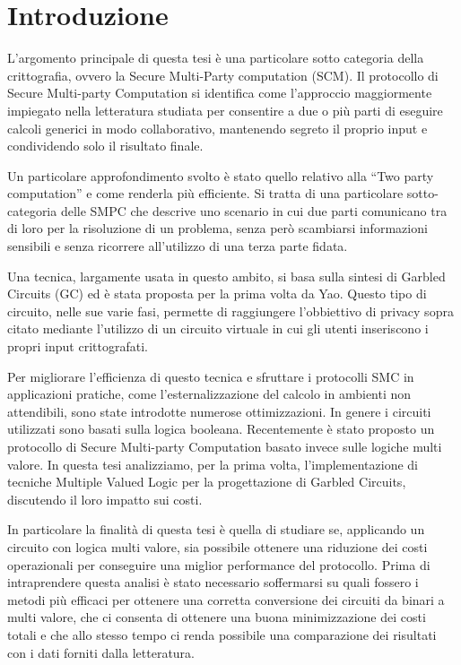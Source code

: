 \documentclass[italian,]{book}
\author{}
\date{\vspace{-2.5em}}
\begin{document}
{
\setcounter{tocdepth}{1}
\tableofcontents
}
\hypertarget{introduzione}{%
\chapter*{Introduzione}\label{introduzione}}

L'argomento principale di questa tesi è una particolare sotto categoria della crittografia, ovvero la Secure Multi-Party computation (SCM). Il protocollo di Secure Multi-party Computation si identifica come l'approccio maggiormente impiegato nella letteratura studiata per consentire a due o più parti di eseguire calcoli generici in modo collaborativo, mantenendo segreto il proprio input e condividendo solo il risultato finale.

Un particolare approfondimento svolto è stato quello relativo alla ``Two party computation'' e come renderla più efficiente.
Si tratta di una particolare sotto-categoria delle SMPC che descrive uno scenario in cui due parti comunicano tra di loro per la risoluzione di un problema, senza però scambiarsi informazioni sensibili e senza ricorrere all'utilizzo di una terza parte fidata. \citep{hemenway2014achieving}

Una tecnica, largamente usata in questo ambito, si basa sulla sintesi di Garbled Circuits (GC) ed è stata proposta per la prima volta da Yao. Questo tipo di circuito, nelle sue varie fasi, permette di raggiungere l'obbiettivo di privacy sopra citato mediante l'utilizzo di un circuito virtuale in cui gli utenti inseriscono i propri input crittografati.

Per migliorare l'efficienza di questo tecnica e sfruttare i protocolli SMC in applicazioni pratiche, come l'esternalizzazione del calcolo in ambienti non attendibili, sono state introdotte numerose ottimizzazioni. In genere i circuiti utilizzati sono basati sulla logica booleana. Recentemente è stato proposto un protocollo di Secure Multi-party Computation basato invece sulle logiche multi valore. In questa tesi analizziamo, per la prima volta, l'implementazione di tecniche Multiple Valued Logic per la progettazione di Garbled Circuits, discutendo il loro impatto sui costi.

In particolare la finalità di questa tesi è quella di studiare se, applicando un circuito con logica multi valore, sia possibile ottenere una riduzione dei costi operazionali per conseguire una miglior performance del protocollo. Prima di intraprendere questa analisi è stato necessario soffermarsi su quali fossero i metodi più efficaci per ottenere una corretta conversione dei circuiti da binari a multi valore, che ci consenta di ottenere una buona minimizzazione dei costi totali e che allo stesso tempo ci renda possibile una comparazione dei risultati con i dati forniti dalla letteratura. \citep{gao2002optimization}
\end{document}
